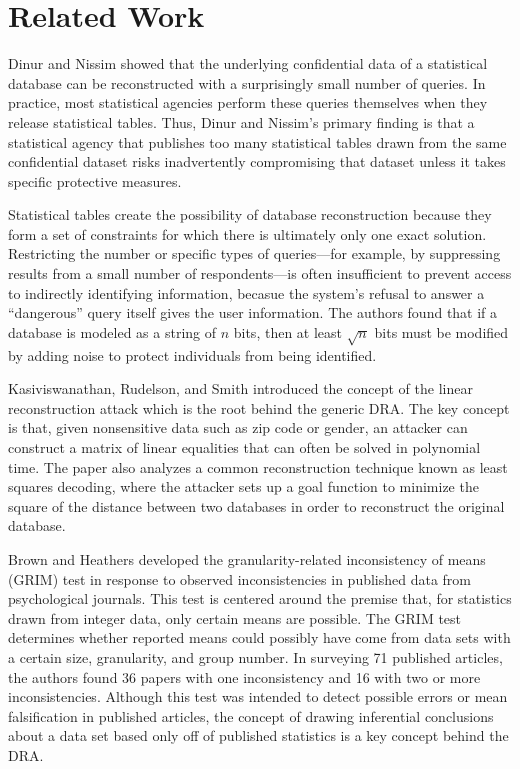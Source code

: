 \documentclass[runningheads]{llncs}
\begin{document}
\section{Related Work}

Dinur and Nissim\cite{noise} showed that the underlying
confidential data of a statistical database can be reconstructed with
a surprisingly small number of queries. In practice, most statistical
agencies perform these queries themselves when they release
statistical tables. Thus, Dinur and Nissim's primary finding 
is that a statistical agency that publishes too many statistical
tables drawn from the same confidential dataset risks inadvertently
compromising that dataset unless it takes specific protective measures.

Statistical tables create the possibility of database reconstruction
because they form a set of constraints for which there is ultimately
only one exact solution. Restricting
the number or specific types of queries---for example, by suppressing
results from a small number of respondents---is often insufficient to prevent access
to indirectly identifying information, becasue the system's refusal to
answer a ``dangerous'' query itself gives the user information. The
authors found that if a database is modeled as a string of $n$ bits,
then at least $\sqrt{n}$ bits must be modified by adding noise to
protect individuals from being identified.


Kasiviswanathan, Rudelson, and Smith\cite{Kasiviswanathan:2013:PLR:2627817.2627919} introduced
the concept of the linear reconstruction attack which is the root
behind the generic DRA. The key concept is that,
given nonsensitive data such as zip code or gender, an attacker
can construct a matrix of linear equalities that can often be solved
in polynomial time. The paper also analyzes a common reconstruction
technique known as least squares decoding, where the attacker sets up
a goal function to minimize the square of the distance between two
databases in order to reconstruct the original database. 

Brown and Heathers\cite{doi:10.1177/1948550616673876} developed the
granularity-related inconsistency of means (GRIM) test in response to
observed inconsistencies in published data from psychological
journals. This test is centered around the premise that, for
statistics drawn from integer data, only certain means are
possible. The GRIM test determines whether reported means could
possibly have come from data sets with a certain size, granularity,
and group number. In surveying 71 published articles, the authors
found 36 papers with one inconsistency and 16 with two or more
inconsistencies. Although this test was intended to detect possible
errors or mean falsification in published articles, the concept of
drawing inferential conclusions about a data set based only off of
published statistics is a key concept behind the DRA.
\end{document}
